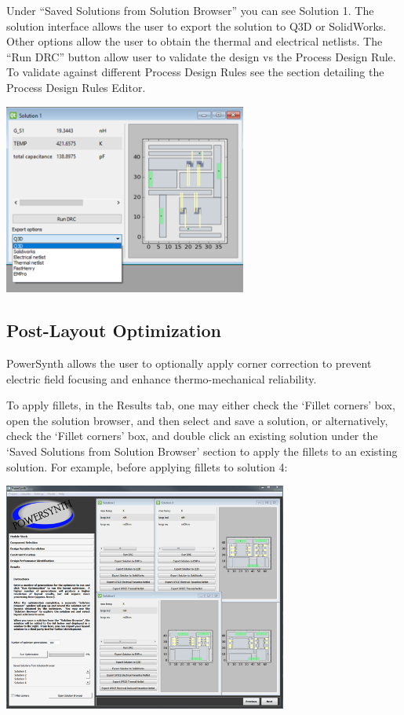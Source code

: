 \documentclass[11pt]{article}
\begin{document}
Under “Saved Solutions from Solution Browser” you can see Solution 1. The solution interface allows the user to export the solution to Q3D or SolidWorks. Other options allow the user to obtain the thermal and electrical netlists. The “Run DRC” button allow user to validate the design vs the Process Design Rule. To validate against different Process Design Rules see the section detailing the Process Design Rules Editor.

\begin{center}
\includegraphics[width=0.6\textwidth]{./figs/29_SolnExport.png}
\end{center}

\pagebreak

\subsection{Post-Layout Optimization}
\label{sec-2-7}

PowerSynth allows the user to optionally apply corner correction to prevent electric field focusing and enhance thermo-mechanical reliability. 

To apply fillets, in the Results tab, one may either check the ‘Fillet corners’ box, open the solution browser, and then select and save a solution, or alternatively, check the ‘Fillet corners’ box, and double click an existing solution under the ‘Saved Solutions from Solution Browser’ section to apply the fillets to an existing solution.
For example, before applying fillets to solution 4:

\begin{center}
\includegraphics[width=0.7\textwidth]{./figs/41_PL1.png}
\end{center}
\end{document}
